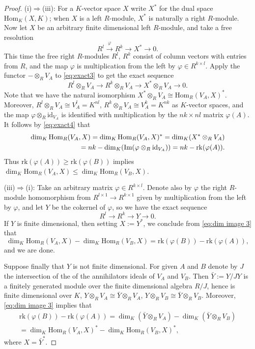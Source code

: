 \documentclass[12pt]{amsart}
\newcommand{\field}{K}
\renewcommand{\hom}{\mathrm{Hom}}
\newcommand{\rank}{\mathrm{rk}}
\begin{document}
\begin{proof}
(i)$\Rightarrow$(iii):  
For a $\field$-vector space $X$ write $X^*$ for the dual space 
$\hom_\field(X,\field)$; when $X$ is a left $R$-module, $X^*$ is naturally a right $R$-module. 
Now let $X$ be an arbitrary finite dimensional left $R$-module, 
and take a free resolution 
\begin{equation}\label{eq:exact3} 
R^l\stackrel{\varphi}\to R^k\to X^*\to 0.\end{equation}
This time the free right $R$-modules $R^l$, $R^k$ consist of column vectors with entries from $R$, 
and the map $\varphi$ is multiplication from the left by 
$\varphi\in R^{k\times l}$.  
Apply the functor $-\otimes_RV_A$ to \eqref{eq:exact3} to get the exact sequence 
\begin{equation}\label{eq:exact4}
R^l\otimes_RV_A\to R^k\otimes_RV_A\to X^*\otimes_RV_A\to 0.
\end{equation}
Note that we have the natural isomorphism 
$X^*\otimes_RV_A\cong\hom_R(V_A,X)^*$. 
Moreover, $R^l\otimes_RV_A\cong V_A^l=\field^{nl}$, 
$R^k\otimes_RV_A\cong V_A^k=\field^{nk}$ as $\field$-vector spaces, and 
the map $\varphi\otimes_R \mathrm{id}_{V_A}$ is identified with multiplication by the 
$nk\times nl$ matrix $\varphi(A)$. 
It follows by \eqref{eq:exact4} that 
\begin{align}\label{eq:dim image 3}
    \dim_\field\hom_R(V_A,X)=\dim_\field\hom_R(V_A,X)^*=
\dim_\field(X^*\otimes_RV_A)
\\ \notag =nk-\dim_\field(\mathrm{Im}(\varphi\otimes_R\mathrm{id}_{V_A}))
=nk-\rank(\varphi(A)). \end{align}
Thus $\rank(\varphi(A))\ge \rank(\varphi(B))$ implies 
$\dim_\field\hom_R(V_A,X)\le \dim_\field\hom_R(V_B,X)$. 

(iii)$\Rightarrow$(i): 
Take an arbitrary matrix $\varphi\in R^{k\times l}$. Denote also by $\varphi$ the right $R$-module homomorphism from 
$R^{l\times 1}\to R^{k\times 1}$ given by multiplication from the left by $\varphi$, and let 
$Y$ be the cokernel of $\varphi$, so we have the exact sequence 
\[R^l\to R^k\to Y\to 0.\]
If $Y$ is finite dimensional, then setting $X:=Y^*$, we conclude from 
\eqref{eq:dim image 3} that 
\[\dim_\field\hom_R(V_A,X)-\dim_\field\hom_R(V_B,X)=\rank(\varphi(B))-\rank(\varphi(A)),\] 
and we are done. 

Suppose finally that $Y$ is not finite dimensional. For given $A$ and $B$ denote by $J$ the intersection of the 
of the annihilators ideals of $V_A$ and $V_B$. Then $\bar Y:=Y/JY$ is a finitely generated module over the finite dimensional algebra 
$R/J$, hence is finite dimensional over $\field$,  $Y\otimes_R V_A\cong \bar Y\otimes_R V_A$, 
 $Y\otimes_R V_B\cong \bar Y\otimes_R V_B$. 
Moreover, \eqref{eq:dim image 3} implies that 
\begin{align*}
\rank(\varphi(B))-\rank(\varphi(A))=\dim_\field(\bar Y\otimes_R V_A)-
\dim_\field(\bar Y\otimes_R V_B)
\\ 
=\dim_\field\hom_R(V_A,X)^*-\dim_\field\hom_R(V_B,X)^*,\end{align*}
where $X=\bar Y^*$. 
\end{proof} 
\end{document}
